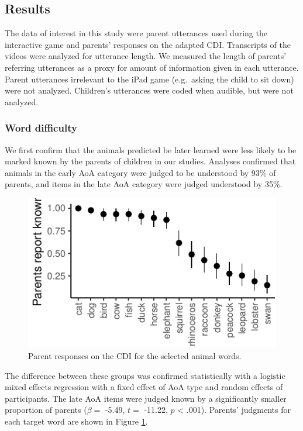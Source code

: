 \documentclass[10pt, letterpaper]{article}
\newenvironment{CodeChunk}{}{}
\begin{document}
\hypertarget{results}{%
\subsection{Results}\label{results}}

The data of interest in this study were parent utterances used during
the interactive game and parents' responses on the adapted CDI.
Transcripts of the videos were analyzed for utterance length. We
measured the length of parents' referring utterances as a proxy for
amount of information given in each utterance. Parent utterances
irrelevant to the iPad game (e.g.~asking the child to sit down) were not
analyzed. Children's utterances were coded when audible, but were not
analyzed.

\hypertarget{word-difficulty}{%
\subsubsection{Word difficulty}\label{word-difficulty}}

We first confirm that the animals predicted be later learned were less
likely to be marked known by the parents of children in our studies.
Analyses confirmed that animals in the early AoA category were judged to
be understood by 93\% of parents, and items in the late AoA category
were judged understood by 35\%.

\begin{CodeChunk}
\begin{figure}[tb]
\includegraphics{figs/difficulty_fig-1} \caption[Parent responses on the CDI for the selected animal words]{Parent responses on the CDI for the selected animal words.}\label{fig:difficulty_fig}
\end{figure}
\end{CodeChunk}

The difference between these groups was confirmed statistically with a
logistic mixed effects regression with a fixed effect of AoA type and
random effects of participants. The late AoA items were judged known by
a significantly smaller proportion of parents (\(\beta =\) -5.49,
\(t =\) -11.22, \(p\) \textless{} .001). Parents' judgments for each
target word are shown in Figure \ref{fig:difficulty_fig}.
\end{document}
